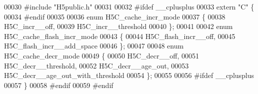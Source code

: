 \begin{DoxyCode}
00030 \textcolor{preprocessor}{#include "H5public.h"}
00031 
00032 \textcolor{preprocessor}{#ifdef \_\_cplusplus}
00033 \textcolor{keyword}{extern} \textcolor{stringliteral}{"C"} \{
00034 \textcolor{preprocessor}{#endif}
00035 
00036 \textcolor{keyword}{enum} H5C\_cache\_incr\_mode
00037 \{
00038     H5C\_incr\_\_off,
00039     H5C\_incr\_\_threshold
00040 \};
00041 
00042 \textcolor{keyword}{enum} H5C\_cache\_flash\_incr\_mode
00043 \{
00044      H5C\_flash\_incr\_\_off,
00045      H5C\_flash\_incr\_\_add\_space
00046 \};
00047 
00048 \textcolor{keyword}{enum} H5C\_cache\_decr\_mode
00049 \{
00050     H5C\_decr\_\_off,
00051     H5C\_decr\_\_threshold,
00052     H5C\_decr\_\_age\_out,
00053     H5C\_decr\_\_age\_out\_with\_threshold
00054 \};
00055 
00056 \textcolor{preprocessor}{#ifdef \_\_cplusplus}
00057 \}
00058 \textcolor{preprocessor}{#endif}
00059 \textcolor{preprocessor}{#endif}
\end{DoxyCode}
